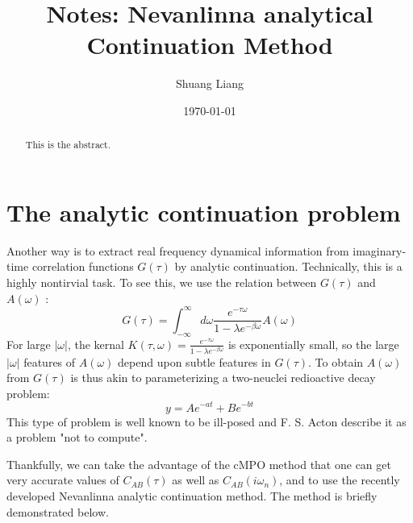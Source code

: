 \documentclass[
	preprint,%
	aps,
	prb,
	showpacs,	
	amsmath, amssymb]{revtex4-2}
\DeclareRobustCommand{\+}{\hstretch{1.25} {\boldsymbol {\mathrel{+}}}}
\begin{document}
\title{Notes: Nevanlinna analytical Continuation Method}
\author{Shuang Liang}



\date{\today}
\begin{abstract}
	This is the abstract.
\end{abstract}


\maketitle
\tableofcontents

\newpage
\section{The analytic continuation problem}
\label{sec:the-analytic-continuation-problem}

Another way is to extract real frequency dynamical information from
imaginary-time correlation functions $G(\tau)$ by analytic continuation.
Technically, this is a highly nontirvial task\cite{jarrell1996bayesian}. To 
see this, we use the relation between $G(\tau)$ and $A(\omega)$
\cite{jarrell1996bayesian,XiaoLRT}:
\begin{equation}\label{eq:gt-Aw}
	G(\tau) = \int_{-\infty}^{\infty} d\omega
		\frac{e^{-\tau \omega }}{1 - \lambda e^{-\beta \omega}}
		A(\omega)
\end{equation}
For large $|\omega|$, the kernal 
$K(\tau, \omega) = \frac{e^{-\tau \omega }}{1 - \lambda e^{-\beta \omega}}$
is exponentially small, so the large $|\omega|$ features of $A(\omega)$ 
depend upon subtle features in $G(\tau)$. To obtain $A(\omega)$ from 
$G(\tau)$ is thus akin to parameterizing a two-neuclei redioactive 
decay problem\cite{gubernatis_kawashima_werner_2016}:
\begin{equation}
	y = Ae^{-at} + Be^{-bt}
\end{equation}
This type of problem is well known to be ill-posed and F. S. Acton describe 
it as a problem "not to compute"\cite{acton1997numerical}.

Thankfully, we can take the advantage of the cMPO method that one 
can get very accurate values of $C_{AB}(\tau)$ as well as 
$C_{AB}(i\omega_n)$, and to use the recently developed Nevanlinna 
analytic continuation method\cite{fei2021nevanlinna}. The method 
is briefly demonstrated below.
      
\end{document}
